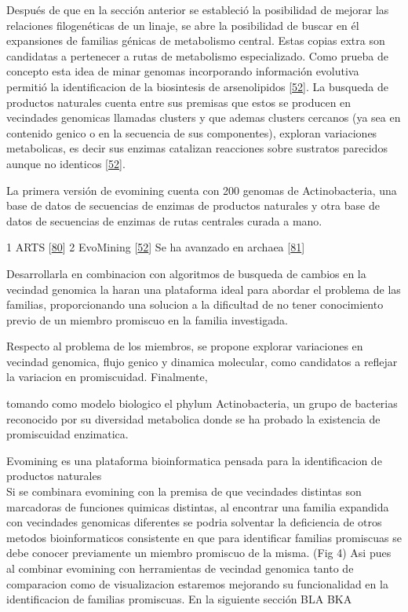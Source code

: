\documentclass[12pt,twoside]{reedthesis}
\begin{document}
  Después de que en la sección anterior se estableció la posibilidad de
  mejorar las relaciones filogenéticas de un linaje, se abre la
  posibilidad de buscar en él expansiones de familias génicas de
  metabolismo central. Estas copias extra son candidatas a pertenecer a
  rutas de metabolismo especializado. Como prueba de concepto esta idea de
  minar genomas incorporando información evolutiva permitió la
  identificacion de la biosintesis de arsenolipidos
  {[}\protect\hyperlink{ref-cruz-morales_phylogenomic_2016}{52}{]}. La
  busqueda de productos naturales cuenta entre sus premisas que estos se
  producen en vecindades genomicas llamadas clusters y que ademas clusters
  cercanos (ya sea en contenido genico o en la secuencia de sus
  componentes), exploran variaciones metabolicas, es decir sus enzimas
  catalizan reacciones sobre sustratos parecidos aunque no identicos
  {[}\protect\hyperlink{ref-cruz-morales_phylogenomic_2016}{52}{]}.
  
  La primera versión de evomining cuenta con 200 genomas de
  Actinobacteria, una base de datos de secuencias de enzimas de productos
  naturales y otra base de datos de secuencias de enzimas de rutas
  centrales curada a mano.
  
  1 ARTS {[}\protect\hyperlink{ref-alanjary_antibiotic_2017}{80}{]} 2
  EvoMining
  {[}\protect\hyperlink{ref-cruz-morales_phylogenomic_2016}{52}{]} Se ha
  avanzado en archaea
  {[}\protect\hyperlink{ref-martinez-nunez_promiscuity_Archaea_2017}{81}{]}
  
  Desarrollarla en combinacion con algoritmos de busqueda de cambios en la
  vecindad genomica la haran una plataforma ideal para abordar el problema
  de las familias, proporcionando una solucion a la dificultad de no tener
  conocimiento previo de un miembro promiscuo en la familia investigada.
  
  Respecto al problema de los miembros, se propone explorar variaciones en
  vecindad genomica, flujo genico y dinamica molecular, como candidatos a
  reflejar la variacion en promiscuidad. Finalmente,
  
  tomando como modelo biologico el phylum Actinobacteria, un grupo de
  bacterias reconocido por su diversidad metabolica donde se ha probado la
  existencia de promiscuidad enzimatica.
  
  Evomining es una plataforma bioinformatica pensada para la
  identificacion de productos naturales\\
  Si se combinara evomining con la premisa de que vecindades distintas son
  marcadoras de funciones quimicas distintas, al encontrar una familia
  expandida con vecindades genomicas diferentes se podria solventar la
  deficiencia de otros metodos bioinformaticos consistente en que para
  identificar familias promiscuas se debe conocer previamente un miembro
  promiscuo de la misma. (Fig 4) Asi pues al combinar evomining con
  herramientas de vecindad genomica tanto de comparacion como de
  visualizacion estaremos mejorando su funcionalidad en la identificacion
  de familias promiscuas. En la siguiente sección BLA BKA
  
\end{document}
